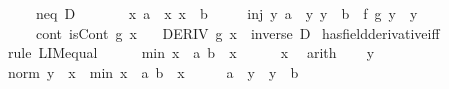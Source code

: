 \begin{isabellebody}
\ \ \ \ \ neq{\isacharcolon}{\kern0pt}\ {\isachardoublequoteopen}D\ {\isasymnoteq}\ {}{\isachardoublequoteclose}\isanewline
\ \ \ \ \ x{\isacharcolon}{\kern0pt}\ {\isachardoublequoteopen}a\ {\isacharless}{\kern0pt}\ x{\isachardoublequoteclose}\ {\isachardoublequoteopen}x\ {\isacharless}{\kern0pt}\ b{\isachardoublequoteclose}\isanewline
\ \ \ \ \ inj{\isacharcolon}{\kern0pt}\ {\isachardoublequoteopen}{\isasymAnd}y{\isachardot}{\kern0pt}\ {\isasymlbrakk}a\ {\isacharless}{\kern0pt}\ y{\isacharsemicolon}{\kern0pt}\ y\ {\isacharless}{\kern0pt}\ b{\isasymrbrakk}\ {\isasymLongrightarrow}\ f\ {\isacharparenleft}{\kern0pt}g\ y{\isacharparenright}{\kern0pt}\ {\isacharequal}{\kern0pt}\ y{\isachardoublequoteclose}\isanewline
\ \ \ \ \ cont{\isacharcolon}{\kern0pt}\ {\isachardoublequoteopen}isCont\ g\ x{\isachardoublequoteclose}\isanewline
\ \ \ {\isachardoublequoteopen}DERIV\ g\ x\ {\isacharcolon}{\kern0pt}{\isachargreater}{\kern0pt}\ inverse\ D{\isachardoublequoteclose}\isanewline
%
\isadelimproof
%
\endisadelimproof
%
\isatagproof
{}\isamarkupfalse%
\ has{\isacharunderscore}{\kern0pt}field{\isacharunderscore}{\kern0pt}derivative{\isacharunderscore}{\kern0pt}iff\isanewline
{}\isamarkupfalse%
\ {\isacharparenleft}{\kern0pt}rule\ LIM{\isacharunderscore}{\kern0pt}equal{}{\isacharparenright}{\kern0pt}\isanewline
\ \ \isamarkupfalse%
\ {\isachardoublequoteopen}{}\ {\isacharless}{\kern0pt}\ min\ {\isacharparenleft}{\kern0pt}x\ {\isacharminus}{\kern0pt}\ a{\isacharparenright}{\kern0pt}\ {\isacharparenleft}{\kern0pt}b\ {\isacharminus}{\kern0pt}\ x{\isacharparenright}{\kern0pt}{\isachardoublequoteclose}\isanewline
\ \ \ \ \isamarkupfalse%
\ x\ \isamarkupfalse%
\ arith\isanewline
{}\isamarkupfalse%
\isanewline
\ \ \isamarkupfalse%
\ y\isanewline
\ \ \isamarkupfalse%
\ {\isachardoublequoteopen}norm\ {\isacharparenleft}{\kern0pt}y\ {\isacharminus}{\kern0pt}\ x{\isacharparenright}{\kern0pt}\ {\isacharless}{\kern0pt}\ min\ {\isacharparenleft}{\kern0pt}x\ {\isacharminus}{\kern0pt}\ a{\isacharparenright}{\kern0pt}\ {\isacharparenleft}{\kern0pt}b\ {\isacharminus}{\kern0pt}\ x{\isacharparenright}{\kern0pt}{\isachardoublequoteclose}\isanewline
\ \ \isamarkupfalse%
\ \isamarkupfalse%
\ {\isachardoublequoteopen}a\ {\isacharless}{\kern0pt}\ y{\isachardoublequoteclose}\ \ {\isachardoublequoteopen}y\ {\isacharless}{\kern0pt}\ b{\isachardoublequoteclose}\isanewline

\end{isabellebody}
